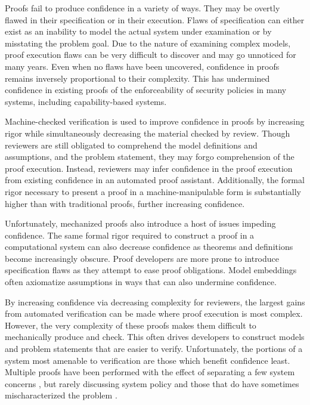 Proofs fail to produce confidence in a variety of ways.
They may be overtly flawed in their specification or in their execution.
Flaws of specification can either exist as an inability to model the actual system under examination or by misstating the problem goal.
Due to the nature of examining complex models, proof execution flaws can be very difficult to discover and may go unnoticed for many years. \cite{GutmannThesis}
Even when no flaws have been uncovered, confidence in proofs remains inversely proportional to their complexity.
This has undermined confidence in existing proofs of the enforceability of security policies in many systems, including capability-based systems.

Machine-checked verification is used to improve confidence in proofs by increasing rigor while simultaneously decreasing the material checked by review.
Though reviewers are still obligated to comprehend the model definitions and assumptions, and the problem statement, they may forgo comprehension of the proof execution.
Instead, reviewers may infer confidence in the proof execution from existing confidence in an automated proof assistant.
Additionally, the formal rigor necessary to present a proof in a machine-manipulable form is substantially higher than with traditional proofs, further increasing confidence.

Unfortunately, mechanized proofs also introduce a host of issues impeding confidence.
The same formal rigor required to construct a proof in a computational system can also decrease confidence as theorems and definitions become increasingly obscure.
Proof developers are more prone to introduce specification flaws as they attempt to ease proof obligations.
Model embeddings often axiomatize assumptions in ways that can also undermine confidence.

By increasing confidence via decreasing complexity for reviewers, the largest gains from automated verification can be made where proof execution is most complex.
However, the very complexity of these proofs makes them difficult to mechanically produce and check.
This often drives developers to construct models and problem statements that are easier to verify.
Unfortunately, the portions of a system most amenable to verification are those which benefit confidence least.
Multiple proofs have been performed with the effect of separating a few system concerns \cite{Karger90avmm}\cite{Yang:2010:SLI}, but rarely discussing system policy and those that do have sometimes mischaracterized the problem  \cite{Elphinstone:formalisingukernel}.

